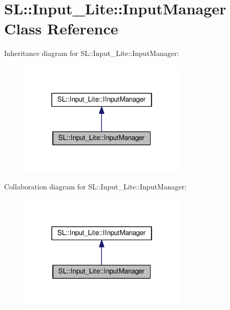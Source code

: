 \hypertarget{class_s_l_1_1_input___lite_1_1_input_manager}{}\section{SL\+:\+:Input\+\_\+\+Lite\+:\+:Input\+Manager Class Reference}
\label{class_s_l_1_1_input___lite_1_1_input_manager}


Inheritance diagram for SL\+:\+:Input\+\_\+\+Lite\+:\+:Input\+Manager\+:\nopagebreak
\begin{figure}[H]
\begin{center}
\leavevmode
\includegraphics[width=226pt]{class_s_l_1_1_input___lite_1_1_input_manager__inherit__graph}
\end{center}
\end{figure}


Collaboration diagram for SL\+:\+:Input\+\_\+\+Lite\+:\+:Input\+Manager\+:\nopagebreak
\begin{figure}[H]
\begin{center}
\leavevmode
\includegraphics[width=226pt]{class_s_l_1_1_input___lite_1_1_input_manager__coll__graph}
\end{center}
\end{figure}
